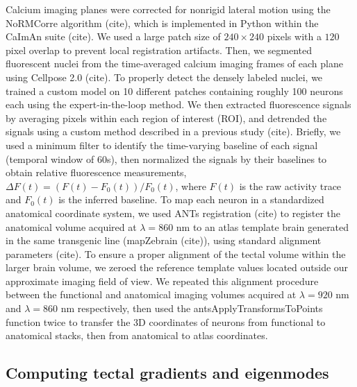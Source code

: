 \documentclass{article}
\begin{document}
Calcium imaging planes were corrected for nonrigid lateral motion using the NoRMCorre algorithm (cite), which is implemented in Python within the CaImAn suite (cite). We used a large patch size of $240\times240$ pixels with a $120$ pixel overlap to prevent local registration artifacts. Then, we segmented fluorescent nuclei from the time-averaged calcium imaging frames of each plane using Cellpose 2.0 (cite). To properly detect the densely labeled nuclei, we trained a custom model on 10 different patches containing roughly 100 neurons each using the expert-in-the-loop method. We then extracted fluorescence signals by averaging pixels within each region of interest (ROI), and detrended the signals using a custom method described in a previous study (cite). Briefly, we used a minimum filter to identify the time-varying baseline of each signal (temporal window of $60$s), then normalized the signals by their baselines to obtain relative fluorescence measurements, $\Delta F(t)=(F(t) - F_0(t))/F_0 (t)$, where $F(t)$ is the raw activity trace and $F_0(t)$ is the inferred baseline. To map each neuron in a standardized anatomical coordinate system, we used ANTs registration (cite) to register the anatomical volume acquired at $\lambda=860$ nm to an atlas template brain generated in the same transgenic line (mapZebrain (cite)), using standard alignment parameters (cite). To ensure a proper alignment of the tectal volume within the larger brain volume, we zeroed the reference template values located outside our approximate imaging field of view. We repeated this alignment procedure between the functional and anatomical imaging volumes acquired at $\lambda=920$ nm and $\lambda=860$ nm respectively, then used the antsApplyTransformsToPoints function twice to transfer the 3D coordinates of neurons from functional to anatomical stacks, then from anatomical to atlas coordinates. 

\subsection*{Computing tectal gradients and eigenmodes}
\end{document}
